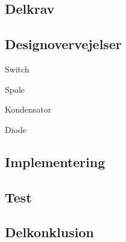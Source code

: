 \documentclass[../main.tex]{subfiles}
\begin{document}
    \subsection{Delkrav}
        
    \subsection{Designovervejelser}
            
            Switch

            Spole

            Kondensator

            Diode


            
    \subsection{Implementering}
        
    \subsection{Test}
        
    \subsection{Delkonklusion}
        
        
\end{document}
